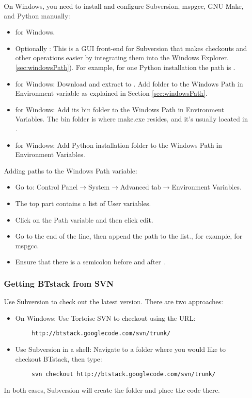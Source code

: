 On Windows, you need to install and configure Subversion, mspgcc, GNU Make, and Python manually:
 \begin{itemize}
 \item \Subversion{} for Windows.
 \item Optionally \Tortoise{}: This is a GUI front-end for Subversion that makes checkouts and other operations easier by integrating them into the Windows Explorer.
 \ref{sec:windowsPath}). For example, for one Python installation the path is  . 
 \item \mspgcc{} for Windows:  Download and extract to . Add  folder to the Windows Path in Environment variable as explained in Section \ref{sec:windowsPath}.
 \item \GNUMake{} for Windows: Add its bin folder to the Windows Path in Environment Variables. The bin folder is where make.exe resides, and it's usually located in . 
 \item \Python{} for Windows: Add Python installation folder to the Windows Path in Environment Variables.
 \end{itemize}

Adding paths to the Windows Path variable:
\begin{itemize} \label{sec:windowsPath}
   \item Go to: Control Panel$\rightarrow$System$\rightarrow$Advanced tab$\rightarrow$Environment Variables.
   \item The top part contains a list of User variables. 
   \item Click on the Path variable and then click edit.
   \item Go to the end of the line, then append the path to the list., for example,  for mspgcc.
   \item Ensure that there is a semicolon before and after . 
\end{itemize}


\subsubsection{Getting BTstack from SVN}

Use Subversion to check out the latest version. There are two approaches:
\begin{itemize}
\item On Windows: Use Tortoise SVN to checkout using the URL:
\end{itemize}
	\begin{lstlisting}
 		http://btstack.googlecode.com/svn/trunk/
	\end{lstlisting}
\begin{itemize}
\item Use Subversion in a shell: Navigate to a folder where you would like to checkout BTstack, then type:
\end{itemize}
	\begin{lstlisting}
 		svn checkout http://btstack.googlecode.com/svn/trunk/
	\end{lstlisting}
In both cases, Subversion will create the  folder and place the code there.



